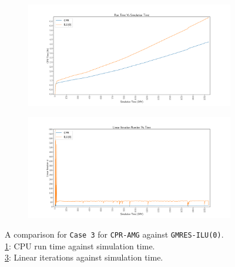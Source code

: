 \begin{figure}
\centering
\begin{subfigure}[b]{\textwidth}
   \includegraphics[width=1\linewidth]{figures/case3/cpu_time.pdf}
   \caption{}
   \label{case3_cpu}
\end{subfigure}

\begin{subfigure}[b]{\textwidth}
   \includegraphics[width=1\linewidth]{figures/case3/its_time.pdf}
   \caption{}
   \label{case3_its}
\end{subfigure}

\caption[caption]{A comparison for \texttt{Case 3} for \texttt{CPR-AMG} against \texttt{GMRES-ILU(0)}.\\\hspace{\textwidth}
	\cref{case3_cpu}: CPU run time against simulation time. \\\hspace{\textwidth}
	\cref{case3_its}: Linear iterations against simulation time.\\\hspace{\textwidth}}
\end{figure}


